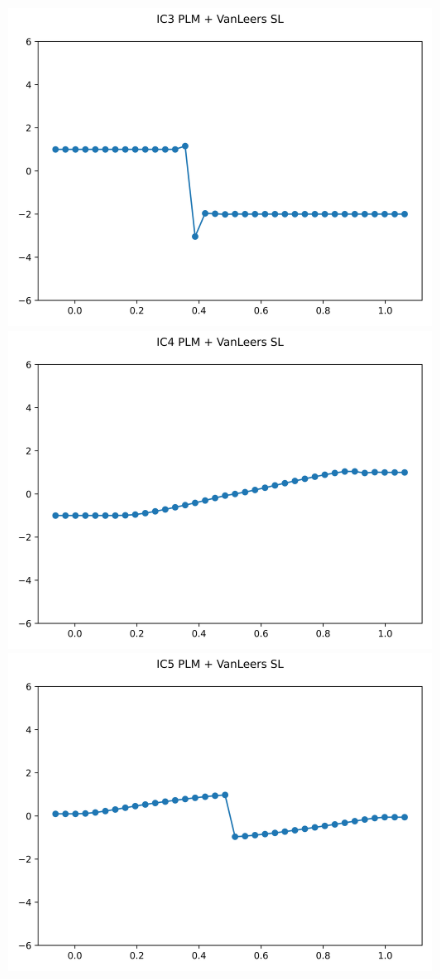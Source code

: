 \documentclass{article}
\begin{document}
\begin{figure}[t]
        \includegraphics[width=.95\textwidth]{../../code/IC3Methodpv_plot.png}
        \includegraphics[width=.95\textwidth]{../../code/IC4Methodpv_plot.png}
        \includegraphics[width=.95\textwidth]{../../code/IC5Methodpv_plot.png}

\end{figure}
\end{document}
